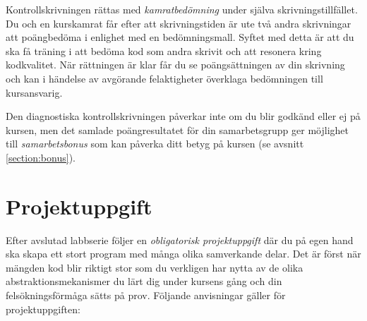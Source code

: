 Kontrollskrivningen rättas med \emph{kamratbedömning} under själva skrivningstillfället. Du och en kurskamrat får efter att skrivningstiden är ute två andra skrivningar att poängbedöma i enlighet med en bedömningsmall. Syftet med detta är att du ska få träning i att bedöma kod som andra skrivit och att resonera kring kodkvalitet. När rättningen är klar får du se poängsättningen av din skrivning och kan i händelse av avgörande felaktigheter överklaga bedömningen till kursansvarig.

Den diagnostiska kontrollskrivningen påverkar inte om du blir godkänd eller ej på kursen, men det samlade poängresultatet för din samarbetsgrupp ger möjlighet till \emph{samarbetsbonus} som kan påverka ditt betyg på kursen (se avsnitt \ref{section:bonus}).

\section{Projektuppgift}\label{section:lab:Projekt}

Efter avslutad labbserie följer en \emph{obligatorisk projektuppgift} där du på egen hand ska skapa ett stort program med många olika samverkande delar. Det är först när mängden kod blir riktigt stor som du verkligen har nytta av de olika abstraktionsmekanismer du lärt dig under kursens gång och din felsökningsförmåga sätts på prov. Följande anvisningar gäller för projektuppgiften:


